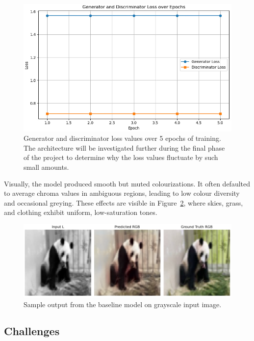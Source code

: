 \documentclass{article} %
\begin{document}
\begin{figure}[htbp]
    \centering
    \includegraphics[width=\textwidth]{Figs/baseline_learning_curve.jpg}
    \caption{Generator and discriminator loss values over 5 epochs of training. The architecture will be investigated further during the final phase of the project to determine why 
    the loss values fluctuate by such small amounts.}

    \label{fig:baseline_curve}
\end{figure}

Visually, the model produced smooth but muted colourizations. It often defaulted to average chroma values in ambiguous regions, leading to low colour diversity and occasional greying. These effects are visible in Figure~\ref{fig:baseline_outputs}, where skies, grass, and clothing exhibit uniform, low-saturation tones.

\begin{figure}[htbp]
    \centering
    \includegraphics[width=\textwidth]{Figs/baseline_output.png}
    \caption{Sample output from the baseline model on grayscale input image.}
    \label{fig:baseline_outputs}
\end{figure}

\subsection{Challenges}
\end{document}
